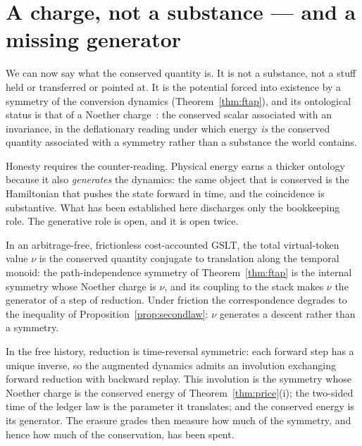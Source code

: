 \section{A charge, not a substance --- and a missing generator}

We can now say what the conserved quantity is.  It is not a substance,
not a stuff held or transferred or pointed at.  It is the potential forced
into existence by a symmetry of the conversion dynamics
(Theorem~\ref{thm:ftap}), and its ontological status is that of a Noether
charge~\cite{Noether}: the conserved scalar associated with an invariance,
in the deflationary reading under which energy \emph{is} the conserved
quantity associated with a symmetry rather than a substance the world
contains.

Honesty requires the counter-reading.  Physical energy earns a thicker
ontology because it also \emph{generates} the dynamics: the same object
that is conserved is the Hamiltonian that pushes the state forward in
time, and the coincidence is substantive.  What has been established here
discharges only the bookkeeping role.  The generative role is open, and it
is open twice.

\begin{conjecture}
\label{conj:conjugacy}
In an arbitrage-free, frictionless cost-accounted GSLT, the total
virtual-token value $\nu$ is the conserved quantity conjugate to
translation along the temporal monoid: the path-independence symmetry of
Theorem~\ref{thm:ftap} is the internal symmetry whose Noether charge is
$\nu$, and its coupling to the stack makes $\nu$ the generator of a step
of reduction.  Under friction the correspondence degrades to the
inequality of Proposition~\ref{prop:secondlaw}: $\nu$ generates a descent
rather than a symmetry.
\end{conjecture}

\begin{conjecture}
\label{conj:reversal}
In the free history, reduction is time-reversal symmetric: each forward
step has a unique inverse, so the augmented dynamics admits an involution
exchanging forward reduction with backward replay.  This involution is the
symmetry whose Noether charge is the conserved energy of
Theorem~\ref{thm:price}(i); the two-sided time of the ledger law is the
parameter it translates; and the conserved energy is its generator.  The
erasure grades then measure how much of the symmetry, and hence how much
of the conservation, has been spent.
\end{conjecture}

